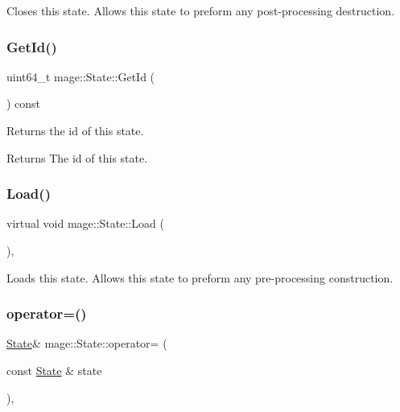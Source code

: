 Closes this state. Allows this state to preform any post-\/processing destruction. \hypertarget{classmage_1_1_state_a07c383a809204ba12a2bbfb22d2977d5}{}\label{classmage_1_1_state_a07c383a809204ba12a2bbfb22d2977d5} 
\subsubsection{\texorpdfstring{Get\+Id()}{GetId()}}
{\footnotesize\ttfamily uint64\+\_\+t mage\+::\+State\+::\+Get\+Id (\begin{DoxyParamCaption}{ }\end{DoxyParamCaption}) const}

Returns the id of this state.

\begin{DoxyReturn}{Returns}
The id of this state. 
\end{DoxyReturn}
\hypertarget{classmage_1_1_state_aa88ace504c82ad372e5e599746f3ebda}{}\label{classmage_1_1_state_aa88ace504c82ad372e5e599746f3ebda} 
\subsubsection{\texorpdfstring{Load()}{Load()}}
{\footnotesize\ttfamily virtual void mage\+::\+State\+::\+Load (\begin{DoxyParamCaption}{ }\end{DoxyParamCaption})\hspace{0.3cm}{\ttfamily [protected]}, {\ttfamily [virtual]}}

Loads this state. Allows this state to preform any pre-\/processing construction. \hypertarget{classmage_1_1_state_a84466f5058f3e27b85a3b164e551008c}{}\label{classmage_1_1_state_a84466f5058f3e27b85a3b164e551008c} 
\subsubsection{\texorpdfstring{operator=()}{operator=()}}
{\footnotesize\ttfamily \hyperlink{classmage_1_1_state}{State}\& mage\+::\+State\+::operator= (\begin{DoxyParamCaption}\item[{const \hyperlink{classmage_1_1_state}{State} \&}]{state }\end{DoxyParamCaption})\hspace{0.3cm}{\ttfamily [private]}, {\ttfamily [delete]}}

